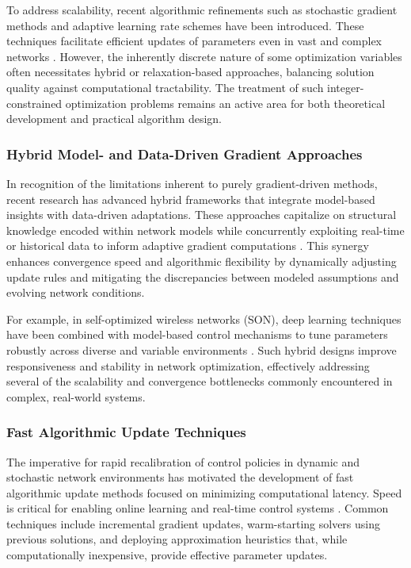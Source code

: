 To address scalability, recent algorithmic refinements such as stochastic gradient methods and adaptive learning rate schemes have been introduced. These techniques facilitate efficient updates of parameters even in vast and complex networks \cite{ref1,ref9,ref10,ref11,ref12,ref14,ref16}. However, the inherently discrete nature of some optimization variables often necessitates hybrid or relaxation-based approaches, balancing solution quality against computational tractability. The treatment of such integer-constrained optimization problems remains an active area for both theoretical development and practical algorithm design.

\subsubsection{Hybrid Model- and Data-Driven Gradient Approaches}

In recognition of the limitations inherent to purely gradient-driven methods, recent research has advanced hybrid frameworks that integrate model-based insights with data-driven adaptations. These approaches capitalize on structural knowledge encoded within network models while concurrently exploiting real-time or historical data to inform adaptive gradient computations \cite{ref5,ref7,ref13}. This synergy enhances convergence speed and algorithmic flexibility by dynamically adjusting update rules and mitigating the discrepancies between modeled assumptions and evolving network conditions.

For example, in self-optimized wireless networks (SON), deep learning techniques have been combined with model-based control mechanisms to tune parameters robustly across diverse and variable environments \cite{ref1}. Such hybrid designs improve responsiveness and stability in network optimization, effectively addressing several of the scalability and convergence bottlenecks commonly encountered in complex, real-world systems.

\subsubsection{Fast Algorithmic Update Techniques}

The imperative for rapid recalibration of control policies in dynamic and stochastic network environments has motivated the development of fast algorithmic update methods focused on minimizing computational latency. Speed is critical for enabling online learning and real-time control systems \cite{ref2,ref3,ref6,ref8,ref9,ref11,ref15,ref16}. Common techniques include incremental gradient updates, warm-starting solvers using previous solutions, and deploying approximation heuristics that, while computationally inexpensive, provide effective parameter updates.


